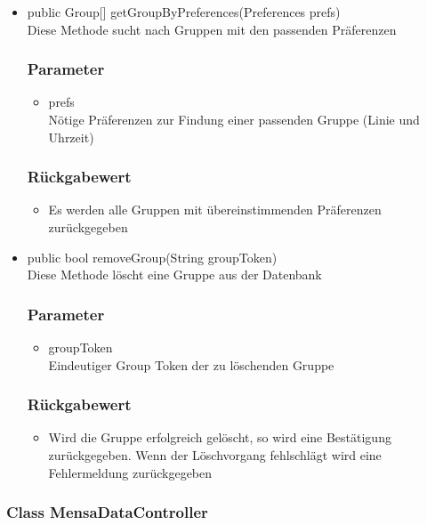 \documentclass[a4paper]{scrreprt}
\begin{document}
\begin{addmargin}[25pt]{0pt}
\begin{itemize}
\item public Group[] getGroupByPreferences(Preferences prefs)\\
	Diese Methode sucht nach Gruppen mit den passenden Präferenzen
	\subsubsection*{Parameter}
	\begin{itemize}
	\item prefs \\
		Nötige Präferenzen zur Findung einer passenden Gruppe (Linie und Uhrzeit)
	\end{itemize}
	\subsubsection*{Rückgabewert}
	\begin{itemize}
	\item Es werden alle Gruppen mit übereinstimmenden Präferenzen zurückgegeben
	\end{itemize}

\item public bool removeGroup(String groupToken)\\
	Diese Methode löscht eine Gruppe aus der Datenbank
	\subsubsection*{Parameter}
	\begin{itemize}
	\item groupToken \\
		Eindeutiger Group Token der zu löschenden Gruppe
	\end{itemize}
	\subsubsection*{Rückgabewert}
	\begin{itemize}
	\item Wird die Gruppe erfolgreich gelöscht, so wird eine Bestätigung zurückgegeben. Wenn der Löschvorgang fehlschlägt wird eine Fehlermeldung zurückgegeben
	\end{itemize}
\end{itemize}
\end{addmargin}

\subsubsection{Class MensaDataController}
\end{document}
